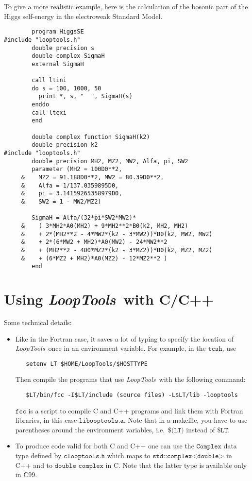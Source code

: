 \documentclass[twoside,12pt]{report}
\def\LT{\textit{LoopTools}}
\def\ie{i.e.\ }
\def\Code#1{\ensuremath{\texttt{#1}}}
\begin{document}
%
To give a more realistic example, here is the calculation of the
bosonic part of the Higgs self-energy in the electroweak Standard Model.
\begin{verbatim}
        program HiggsSE
#include "looptools.h"
        double precision s
        double complex SigmaH
        external SigmaH

        call ltini
        do s = 100, 1000, 50
          print *, s, "  ", SigmaH(s)
        enddo
        call ltexi
        end

        double complex function SigmaH(k2)
        double precision k2
#include "looptools.h"
        double precision MH2, MZ2, MW2, Alfa, pi, SW2
        parameter (MH2 = 100D0**2,
     &    MZ2 = 91.188D0**2, MW2 = 80.39D0**2,
     &    Alfa = 1/137.0359895D0,
     &    pi = 3.14159265358979D0,
     &    SW2 = 1 - MW2/MZ2)

        SigmaH = Alfa/(32*pi*SW2*MW2)*
     &    ( 3*MH2*A0(MH2) + 9*MH2**2*B0(k2, MH2, MH2)
     &    + 2*(MH2**2 - 4*MW2*(k2 - 3*MW2))*B0(k2, MW2, MW2)
     &    + 2*(6*MW2 + MH2)*A0(MW2) - 24*MW2**2
     &    + (MH2**2 - 4D0*MZ2*(k2 - 3*MZ2))*B0(k2, MZ2, MZ2)
     &    + (6*MZ2 + MH2)*A0(MZ2) - 12*MZ2**2 )
        end
\end{verbatim}


\section{Using \LT\ with C/C++}

%
\index{c++ command line@\Code{c++} command line}%
Some technical details:
\begin{itemize}
\item Like in the Fortran case, it saves a lot of typing to specify the
location of \LT\ once in an environment variable.  For example, in the
\Code{tcsh}, use
\begin{verbatim}
   setenv LT $HOME/LoopTools/$HOSTTYPE
\end{verbatim}
Then compile the programs that use \LT\ with the following command:
\begin{verbatim}
   $LT/bin/fcc -I$LT/include (source files) -L$LT/lib -looptools
\end{verbatim}
\Code{fcc} is a script to compile C and C++ programs and link them with
Fortran libraries, in this case \Code{libooptools.a}.  Note that in a
makefile, you have to use parentheses around the environment variables,
\ie \Code{\$(LT)} instead of \Code{\$LT}.

\item To produce code valid for both C and C++ one can use the 
\Code{Complex} data type defined by \Code{clooptools.h} which maps to
\Code{std::complex<double>} in C++ and to \Code{double complex} in C.
Note that the latter type is available only in C99.
\end{itemize}
\end{document}
